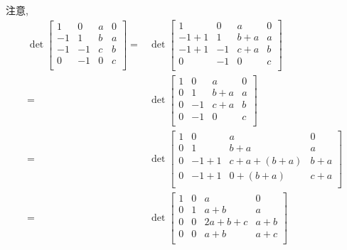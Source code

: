 \documentclass[../libro.tex]{subfiles}
\begin{document}
\begin{example}
    注意,
    \begin{align*}
        \det {
            \begin{bmatrix}
                1  & 0  & a & 0 \\
                -1 & 1  & b & a \\
                -1 & -1 & c & b \\
                0  & -1 & 0 & c \\
            \end{bmatrix}
        }
        = {} &
        \det {
            \begin{bmatrix}
                1    & 0  & a   & 0 \\
                -1+1 & 1  & b+a & a \\
                -1+1 & -1 & c+a & b \\
                0    & -1 & 0   & c \\
            \end{bmatrix}
        }
        \\
        = {} &
        \det {
            \begin{bmatrix}
                1 & 0  & a   & 0 \\
                0 & 1  & b+a & a \\
                0 & -1 & c+a & b \\
                0 & -1 & 0   & c \\
            \end{bmatrix}
        }
        \\
        = {} &
        \det {
            \begin{bmatrix}
                1 & 0  & a           & 0   \\
                0 & 1  & b+a         & a   \\
                0 & -1+1 & c+a+(b+a) & b+a \\
                0 & -1+1 & 0+(b+a)   & c+a \\
            \end{bmatrix}
        }
        \\
        = {} &
        \det {
            \begin{bmatrix}
                1 & 0 & a      & 0   \\
                0 & 1 & a+b    & a   \\
                0 & 0 & 2a+b+c & a+b \\
                0 & 0 & a+b    & a+c \\
            \end{bmatrix}
}
\end{align*}
\end{example}
\end{document}
